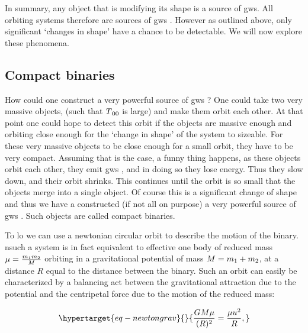\documentclass[
  10pt,
  a4paper,
  DIV=11,
  numbers=noendperiod,
  twoside]{scrreprt}
\DeclareRobustCommand{\[}{\begin{equation}}
\DeclareRobustCommand{\]}{\end{equation}}
\begin{document}
In summary, any object that is modifying its shape is a source of
\glspl{gw}. All orbiting systems therefore are sources of \glspl{gw} .
However as outlined above, only significant `changes in shape' have a
chance to be detectable. We will now explore these phenomena.

\hypertarget{sec-compactbinaries}{%
\subsection{Compact binaries}\label{sec-compactbinaries}}

How could one construct a very powerful source of \glspl{gw} ? One could
take two very massive objects, (such that \(\SEco[00]\) is large) and
make them orbit each other. At that point one could hope to detect this
orbit if the objects are massive enough and orbiting close enough for
the `change in shape' of the system to sizeable. For these very massive
objects to be close enough for a small orbit, they have to be very
compact. Assuming that is the case, a funny thing happens, as these
objects orbit each other, they emit \glspl{gw} , and in doing so they
lose energy. Thus they slow down, and their orbit
shrinks. This continues until the orbit is so small that the objects
merge into a single object. Of course this is a significant change of
shape and thus we have a constructed (if not all on purpose) a very
powerful source of \glspl{gw} . Such objects are called compact
binaries.

To \gls{lo} we can use a newtonian circular orbit to describe the motion
of the binary. nsuch a system is in fact equivalent to effective one
body  of reduced mass \(\redmass=\frac{\mass[1]\mass[2]}{\totmass}\)
orbiting in a gravitational potential of mass
\(\totmass=\mass[1]+\mass[2]\), at a distance \(R\) equal to the
distance between the binary. Such an orbit can easily be characterized
by a balancing act between the gravitational attraction due to the
potential and the centripetal force due to the motion of the reduced
mass:

\begin{equation}\protect\hypertarget{eq-newtongrav}{}{
\frac{\grav \totmass\redmass}{\pa{\dist}^2}=\frac{\redmass \vel^2}{\dist},
}\label{eq-newtongrav}\end{equation}
\end{document}
